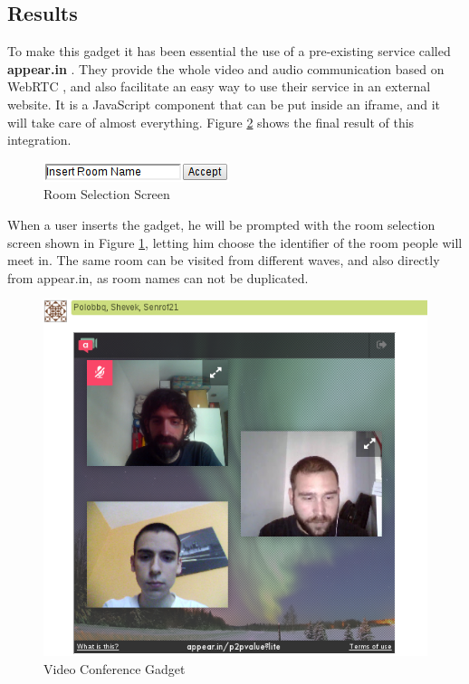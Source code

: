 \subsection{Results}
To make this gadget it has been essential the use of a pre-existing service called \textbf{appear.in} \cite{ref:appearin}. They provide the whole video and audio communication based on WebRTC \cite{ref:webrtc}, and also facilitate an easy way to use their service in an external website. It is a JavaScript component that can be put inside an iframe, and it will take care of almost everything. Figure \ref{fig:video_gadget} shows the final result of this integration.
\begin{figure}[H]
  \center
    \includegraphics[keepaspectratio, scale=0.8]{Media/Captures/Extensions/VideoGadget/RoomSelection.png}
  \caption{Room Selection Screen}
  \label{fig:video_gadget_room}
\end{figure}
When a user inserts the gadget, he will be prompted with the room selection screen shown in Figure \ref{fig:video_gadget_room}, letting him choose the identifier of the room people will meet in. The same room can be visited from different waves, and also directly from appear.in, as room names can not be duplicated.
\begin{figure}[H]
  \center
    \includegraphics[keepaspectratio, scale=0.45]{Media/Captures/Extensions/VideoGadget.png}
  \caption{Video Conference Gadget}
  \label{fig:video_gadget}
\end{figure}
